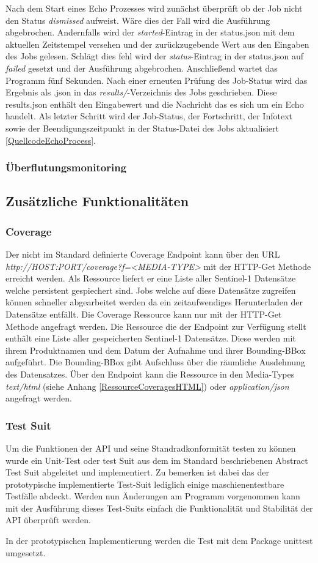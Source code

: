 Nach dem Start eines Echo Prozesses wird zunächst überprüft ob der Job nicht den Status \textit{dismissed} aufweist. Wäre dies der Fall wird die Ausführung abgebrochen. 
Andernfalls wird der \textit{started}-Eintrag in der status.json mit dem aktuellen Zeitstempel versehen und der zurückzugebende Wert aus den Eingaben des Jobs gelesen.
Schlägt dies fehl wird der \textit{status}-Eintrag in der status.json auf \textit{failed} gesetzt und der Ausführung abgebrochen. 
Anschließend wartet das Programm fünf Sekunden. Nach einer erneuten Prüfung des Job-Status wird das Ergebnis als .json in das \textit{results/}-Verzeichnis des Jobs geschrieben.
Diese results.json enthält den Eingabewert und die Nachricht das es sich um ein Echo handelt. 
Als letzter Schritt wird der Job-Status, der Fortschritt, der Infotext sowie der Beendigungszeitpunkt in der Status-Datei des Jobs aktualisiert \ref{QuellcodeEchoProcess}. 
\subsubsection{Überflutungsmonitoring}
\subsection{Zusätzliche Funktionalitäten}
\subsubsection{Coverage} 
Der nicht im Standard definierte Coverage Endpoint kann über den URL \textit{http://HOST:PORT/coverage?f=<MEDIA-TYPE>} mit der HTTP-Get Methode erreicht werden. 
Als Ressource liefert er eine Liste aller Sentinel-1 Datensätze welche persistent gespiechert sind. 
Jobs welche auf diese Datensätze zugreifen können schneller abgearbeitet werden da ein zeitaufwendiges Herunterladen der Datensätze entfällt. 
Die Coverage Ressource kann nur mit der HTTP-Get Methode angefragt werden. 
Die Ressource die der Endpoint zur Verfügung stellt enthält eine Liste aller gespeicherten Sentinel-1 Datensätze. 
Diese werden mit ihrem Produktnamen und dem Datum der Aufnahme 
und ihrer Bounding-BBox aufgeführt. Die Bounding-BBox gibt Aufschluss über die räumliche Ausdehnung des Datensatzes. 
Über den Endpoint kann die Ressource in den Media-Types \textit{text/html} (siehe Anhang \ref{RessourceCoveragesHTML}) oder \textit{application/json} angefragt werden. 

\subsubsection{Test Suit}
Um die Funktionen der API und seine Standradkonformität testen zu können wurde ein Unit-Test oder test Suit aus dem im Standard beschriebenen Abstract Test Suit abgeleitet und 
implementiert. Zu bemerken ist dabei das der prototypische implementierte Test-Suit lediglich einige maschienentestbare Testfälle abdeckt. 
Werden nun Änderungen am Programm vorgenommen kann mit der Ausführung dieses Test-Suits einfach die Funktionalität und Stabilität der API überprüft werden. 

In der prototypischen Implementierung werden die Test mit dem Package unittest umgesetzt.  